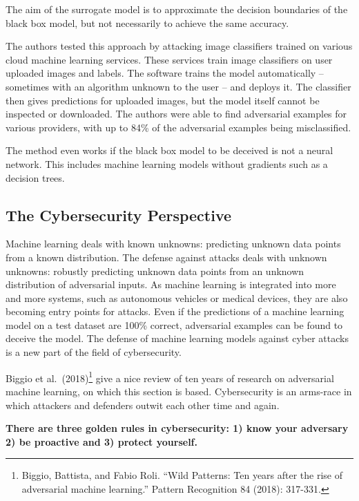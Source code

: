 \documentclass[
  10pt,
]{scrbook}
\begin{document}
The aim of the surrogate model is to approximate the decision boundaries of the black box model, but not necessarily to achieve the same accuracy.

The authors tested this approach by attacking image classifiers trained on various cloud machine learning services.
These services train image classifiers on user uploaded images and labels.
The software trains the model automatically -- sometimes with an algorithm unknown to the user -- and deploys it.
The classifier then gives predictions for uploaded images, but the model itself cannot be inspected or downloaded.
The authors were able to find adversarial examples for various providers, with up to 84\% of the adversarial examples being misclassified.

The method even works if the black box model to be deceived is not a neural network.
This includes machine learning models without gradients such as a decision trees.

\hypertarget{the-cybersecurity-perspective}{%
\subsection{The Cybersecurity Perspective}\label{the-cybersecurity-perspective}}

Machine learning deals with known unknowns: predicting unknown data points from a known distribution.
The defense against attacks deals with unknown unknowns: robustly predicting unknown data points from an unknown distribution of adversarial inputs.
As machine learning is integrated into more and more systems, such as autonomous vehicles or medical devices, they are also becoming entry points for attacks.
Even if the predictions of a machine learning model on a test dataset are 100\% correct, adversarial examples can be found to deceive the model.
The defense of machine learning models against cyber attacks is a new part of the field of cybersecurity.

Biggio et al.~(2018)\footnote{Biggio, Battista, and Fabio Roli. ``Wild Patterns: Ten years after the rise of adversarial machine learning.'' Pattern Recognition 84 (2018): 317-331.} give a nice review of ten years of research on adversarial machine learning, on which this section is based.
Cybersecurity is an arms-race in which attackers and defenders outwit each other time and again.

\textbf{There are three golden rules in cybersecurity: 1) know your adversary 2) be proactive and 3) protect yourself.}
\end{document}
